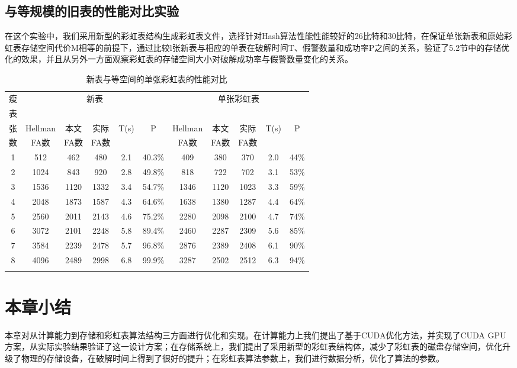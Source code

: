 \subsection{与等规模的旧表的性能对比实验}
在这个实验中，我们采用新型的彩虹表结构生成彩虹表文件，选择针对Hash算法性能性能较好的26比特和30比特，在保证单张新表和原始彩虹表存储空间代价M相等的前提下，通过比较l张新表与相应的单表在破解时间T、假警数量和成功率P之间的关系，验证了5.2节中的存储优化的效果，并且从另外一方面观察彩虹表的存储空间大小对破解成功率与假警数量变化的关系。
\begin{longtable}{@{\extracolsep{\fill}}ccccccccccc}
\caption{新表与等空间的单张彩虹表的性能对比}\\\toprule[1pt]
\multicolumn{1}{c}{瘦} & \multicolumn{5}{c}{新表} & \multicolumn{5}{c}{单张彩虹表} \\
\multicolumn{1}{c}{表} \\
\multicolumn{1}{c}{张} & \multicolumn{1}{c}{Hellman} & \multicolumn{1}{c}{本文} & \multicolumn{1}{c}{实际} & \multicolumn{1}{c}{T(s)} & \multicolumn{1}{c}{P} &
\multicolumn{1}{c}{Hellman} & \multicolumn{1}{c}{本文} & \multicolumn{1}{c}{实际} & \multicolumn{1}{c}{T(s)} & \multicolumn{1}{c}{P} \\
\multicolumn{1}{c}{数} & \multicolumn{1}{c}{FA数} & \multicolumn{1}{c}{FA数} & \multicolumn{1}{c}{FA数} &  &  &
\multicolumn{1}{c}{FA数} & \multicolumn{1}{c}{FA数} & \multicolumn{1}{c}{FA数} & &  \\\midrule
1 & 512  & 462  & 480  & 2.1 & 40.3\% & 409  & 380  & 370  & 2.0 & 44\%    \\
2 & 1024 & 843  & 920  & 2.8 & 49.8\% & 818  & 722  & 702  & 3.1 & 53\%   \\
3 & 1536 & 1120 & 1332 & 3.4 & 54.7\% & 1346 & 1120 & 1023 & 3.3 & 59\%  \\
4 & 2048 & 1873 & 1587 & 4.3 & 64.6\% & 1638 & 1380 & 1287 & 4.4 & 64\%  \\
5 & 2560 & 2011 & 2143 & 4.6 & 75.2\% & 2280 & 2098 & 2100 & 4.7 & 74\% \\
6 & 3072 & 2101 & 2248 & 5.8 & 89.4\% & 2460 & 2287 & 2309 & 5.6 & 85\%    \\
7 & 3584 & 2239 & 2478 & 5.7 & 96.8\% & 2876 & 2389 & 2408 & 6.1 & 90\% \\
8 & 4096 & 2489 & 2998 & 6.8 & 99.9\% & 3287 & 2502 & 2512 & 6.3 & 94\%  \\
\bottomrule[1pt]
\label{tab:5.7}
\end{longtable}

\section{本章小结}
本章对从计算能力到存储和彩虹表算法结构三方面进行优化和实现。在计算能力上我们提出了基于CUDA优化方法，并实现了CUDA GPU方案，从实际实验结果验证了这一设计方案；在存储系统上，我们提出了采用新型的彩虹表结构体，减少了彩虹表的磁盘存储空间，优化升级了物理的存储设备，在破解时间上得到了很好的提升；在彩虹表算法参数上，我们进行数据分析，优化了算法的参数。


